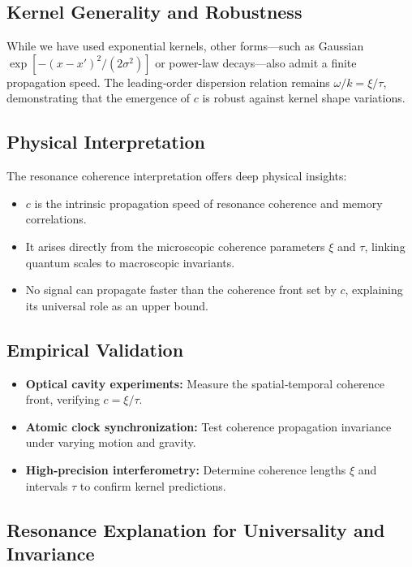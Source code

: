 

\subsection{Kernel Generality and Robustness}

While we have used exponential kernels, other forms—such as Gaussian
\(\exp[-(x-x')^2/(2\sigma^2)]\) or power-law decays—also admit a finite propagation speed. The leading‐order dispersion relation remains \(\omega/k=\xi/\tau\), demonstrating that the emergence of \(c\) is robust against kernel shape variations.

\subsection{Physical Interpretation}

The resonance coherence interpretation offers deep physical insights:

\begin{itemize}
  \item \(c\) is the intrinsic propagation speed of resonance coherence and memory correlations.
  \item It arises directly from the microscopic coherence parameters \(\xi\) and \(\tau\), linking quantum scales to macroscopic invariants.
  \item No signal can propagate faster than the coherence front set by \(c\), explaining its universal role as an upper bound.
\end{itemize}

\subsection{Empirical Validation}

\begin{itemize}
  \item \textbf{Optical cavity experiments:} Measure the spatial‐temporal coherence front, verifying \(c=\xi/\tau\).
  \item \textbf{Atomic clock synchronization:} Test coherence propagation invariance under varying motion and gravity.
  \item \textbf{High‐precision interferometry:} Determine coherence lengths \(\xi\) and intervals \(\tau\) to confirm kernel predictions.
\end{itemize}

\subsection{Resonance Explanation for Universality and Invariance}

